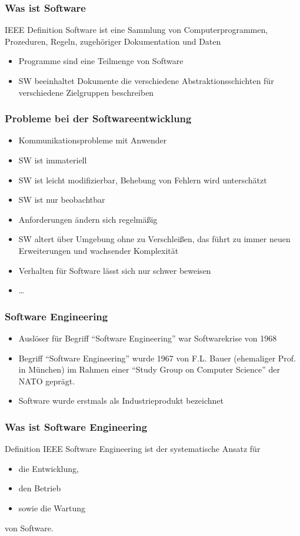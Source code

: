 \begin{frame}
\frametitle{Was ist Software}
	\begin{block}{IEEE Definition}
		Software ist eine Sammlung von Computerprogrammen, Prozeduren, Regeln,
		zugehöriger Dokumentation und Daten
		\begin{itemize}
			 \item Programme sind eine Teilmenge von Software
			 \item SW beeinhaltet Dokumente die verschiedene Abstraktionsschichten
			 für verschiedene Zielgruppen beschreiben
		\end{itemize}
	\end{block}
\end{frame}

\begin{frame}
\frametitle{Probleme bei der Softwareentwicklung}
	\begin{itemize}
		 \item Kommunikationsprobleme mit Anwender
		 \item SW ist immateriell
		 \item SW ist leicht modifizierbar, Behebung von Fehlern wird unterschätzt
		 \item SW ist nur beobachtbar
		 \item Anforderungen ändern sich regelmäßig
		 \item SW altert über Umgebung ohne zu Verschleißen,
		 das führt zu immer neuen Erweiterungen und wachsender Komplexität
		 \item Verhalten für Software lässt sich nur schwer beweisen
		 \item \ldots
	\end{itemize}
\end{frame}

\begin{frame}
\frametitle{Software Engineering}
	\begin{itemize}
		\item Auslöser für Begriff ``Software Engineering'' war Softwarekrise von 1968
		\item Begriff ``Software Engineering'' wurde 1967 von F.L. Bauer (ehemaliger Prof. in München) 
		im Rahmen einer ``Study Group on Computer Science'' der NATO geprägt.
		\item Software wurde erstmals als Industrieprodukt bezeichnet
	\end{itemize}
\end{frame}

\begin{frame}
\frametitle{Was ist Software Engineering}
	\begin{block}{Definition IEEE}
		Software Engineering ist der systematische Ansatz für
		\begin{itemize}
			\item die Entwicklung,
			\item den Betrieb
			\item sowie die Wartung
		\end{itemize}
		von Software.
	\end{block}
\end{frame}

